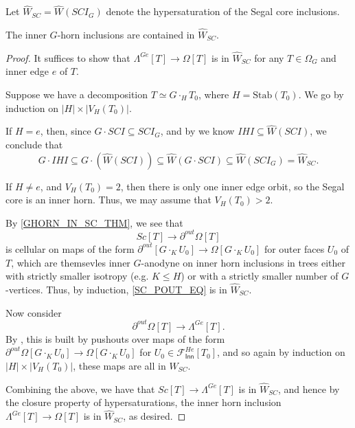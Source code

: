 \documentclass[a4paper,10pt,draft]{article}%
\numberwithin{equation}{section}%
\numberwithin{figure}{section}
\begin{document}
\begin{definition}
      Let $\hat{W}_{SC} = \hat{W}(SCI_G)$ denote the hypersaturation of the Segal core inclusions.
\end{definition}

\begin{lemma}
      \label{GHORN_IN_SC_THM}
      The inner $G$-horn inclusions are contained in $\hat{W}_{SC}$.
\end{lemma}
\begin{proof}
      It suffices to show that $\Lambda^{G e}[T] \to \Omega[T]$ is in $\hat{W}_{SC}$
      for any $T\in \Omega_G$ and inner edge $e$ of $T$.

      Suppose we have a decomposition $T \simeq G \cdot_H T_0$, where $H = \mathrm{Stab}(T_0)$.
      We go by induction on $|H| \times |V_H(T_0)|$.

      If $H = e$, then, since $G \cdot SCI \subseteq SCI_G$,
      and by \cite[2.5]{CM13a} we know $IHI \subseteq \hat{W}(SCI)$, we conclude that
      \begin{equation}
            G \cdot IHI \subseteq G \cdot (\hat{W}(SCI)) \subseteq \hat{W}(G \cdot SCI) \subseteq \hat{W}(SCI_G) = \hat{W}_{SC}.
      \end{equation}
      
      If $H \neq e$, and $V_H(T_0) = 2$, then there is only one inner edge orbit, so
      the Segal core is an inner horn.
      Thus, we may assume that $V_H(T_0) > 2$.

      By \cref{GHORN_IN_SC_THM}, we see that
      \begin{equation}
            \label{SC_POUT_EQ}
            Sc[T] \to \partial^{out}\Omega[T]
      \end{equation}
      is cellular on maps of the form
      $\partial^{out}[G \cdot_K U_0] \to \Omega[G \cdot_K U_0]$ for outer faces $U_0$ of $T$,
      which are themsevles inner $G$-anodyne on inner horn inclusions in trees either
      with strictly smaller isotropy (e.g. $K \leq H$) or
      with a strictly smaller number of $G$-vertices.
      Thus, by induction, \eqref{SC_POUT_EQ} is in $\hat{W}_{SC}$. 

      Now consider
      \begin{equation}
            \label{POUT_GHORN_EQ}
            \partial^{out}\Omega[T] \to \Lambda^{G e}[T].
      \end{equation}
      By \cite[Proposition 6.17]{Per17},
      this is built by pushouts over maps of the form
      $\partial^{out}\Omega[G \cdot_K U_0] \to \Omega[G \cdot_K U_0]$ for $U_0 \in \mathscr{F}_{\mathsf{Inn}}^{H e}[T_0]$,
      and so again by induction on $|H| \times |V_H(T_0)|$, these maps are all in $\hat{W}_{SC}$. 
      
      Combining the above, we have that $Sc[T] \to \Lambda^{G e}[T]$ is in $\hat{W}_{SC}$, and hence
      by the closure property of hypersaturations, the inner horn inclusion $\Lambda^{G e}[T] \to \Omega[T]$
      is in $\hat{W}_{SC}$, as desired.
\end{proof}
\end{document}
